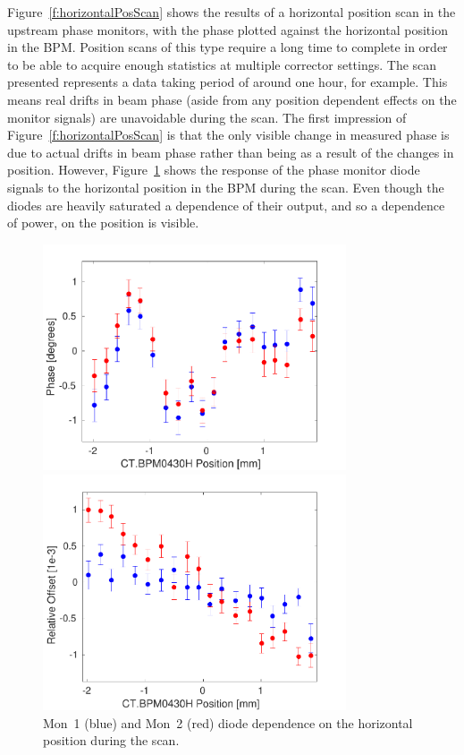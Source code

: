 Figure~\ref{f:horizontalPosScan} shows the results of a horizontal position scan in the upstream phase monitors, with the phase plotted against the horizontal position in the BPM. Position scans of this type require a long time to complete in order to be able to acquire enough statistics at multiple corrector settings. The scan presented represents a data taking period of around one hour, for example. This means real drifts in beam phase (aside from any position dependent effects on the monitor signals) are unavoidable during the scan. The first impression of Figure~\ref{f:horizontalPosScan} is that the only visible change in measured phase is due to actual drifts in beam phase rather than being as a result of the changes in position. However, Figure~\ref{f:horizontalScanDiode} shows the response of the phase monitor diode signals to the horizontal position in the BPM during the scan. Even though the diodes are heavily saturated a dependence of their output, and so a dependence of power, on the position is visible. 

\begin{figure}
  \centering
  \includegraphics[width=0.8\textwidth]{Figures/phaseMons/horizontalPosScan}
  \caption{Mon~1 (blue) and Mon~2 (red) phase dependence on the horizontal position during the scan.}
  \label{f:horizontalPosScan}
  \includegraphics[width=0.8\textwidth]{Figures/phaseMons/horizontalScanDiode}
  \caption{Mon~1 (blue) and Mon~2 (red) diode dependence on the horizontal position during the scan.}
  \label{f:horizontalScanDiode}
\end{figure}

